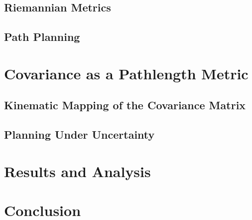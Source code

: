 \documentclass[10pt,conference]{ieeeconf}
\begin{document}
\subsection{Riemannian Metrics}
\subsection{Path Planning}

\section{Covariance as a Pathlength Metric}\label{sec:methods}
\subsection{Kinematic Mapping of the Covariance Matrix}
\subsection{Planning Under Uncertainty}

\section{Results and Analysis}\label{sec:analysis}

\section{Conclusion}\label{sec:conclusion}



\end{document}
